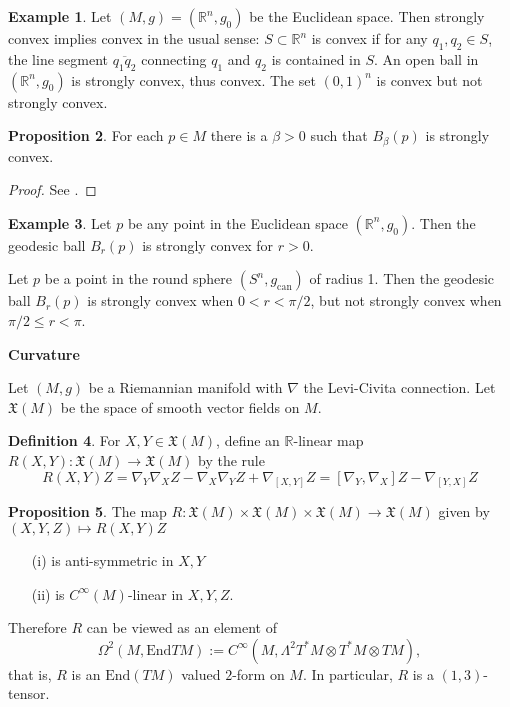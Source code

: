 \documentclass{amsart}
\numberwithin{equation}{section}
\newcommand{\bR}{\mathbb{R}}
\newcommand{\End}{\mathrm{End}}
\theoremstyle{definition}
\newtheorem{definition}{Definition} [section]
\newtheorem{example}[definition]{Example}
\theoremstyle{theorem}
\newtheorem{proposition}[definition]{Proposition}
\begin{document}
\begin{example}
Let $(M,g) = (\bR^n, g_0)$ be the Euclidean space.  Then strongly convex implies convex in the usual sense: $S\subset \bR^n$ is convex if for any $q_1, q_2\in S$, the
line segment $\overline{q_1q_2}$ connecting $q_1$ and $q_2$ is contained in $S$.
An open ball in $(\bR^n,g_0)$ is strongly convex, thus convex. 
The set $(0,1)^n$ is convex but not strongly convex.
\end{example}

\begin{proposition}
For each $p \in M$ there is a $\beta > 0$ such that $B_{\beta}(p)$ is strongly convex. 
\end{proposition}
\begin{proof}
See \cite[Chapter 3, Section 4]{dC}. 
\end{proof}

\begin{example}
Let $p$ be any point in the Euclidean space $(\bR^n,g_0)$. Then the geodesic ball $B_r(p)$ is strongly convex for $r>0$.

Let $p$ be a point in the round sphere $(S^n,g_{\mathrm{can}})$ of radius 1. Then the geodesic ball
$B_r(p)$ is strongly convex when $0<r<\pi/2$, but not strongly convex when $\pi/2\leq r< \pi$. 
\end{example}



\noindent
{\bf \large Curvature}

Let $(M,g)$ be a Riemannian manifold with $\nabla$ the Levi-Civita connection. Let $\mathfrak{X}(M)$ be the space of smooth vector fields on $M$. 

\begin{definition}
For $X,Y \in \mathfrak{X}(M)$, define an $\mathbb{R}$-linear map $R(X,Y) : \mathfrak{X}(M) \to \mathfrak{X}(M)$ by the rule 
\[
R(X,Y)Z = \nabla_Y \nabla_X Z - \nabla_X \nabla_Y Z + \nabla_{[X,Y]}Z = [\nabla_Y, \nabla_X]Z - \nabla_{[Y,X]}Z
\]
\end{definition}

\begin{proposition}
The map $R : \mathfrak{X}(M) \times \mathfrak{X}(M) \times  \mathfrak{X}(M) \to \mathfrak{X}(M)$ given by $(X,Y,Z) \mapsto R(X,Y)Z$ 
\begin{enumerate}
\item[(i)] is anti-symmetric in $X,Y$
\item[(ii)] is $C^\infty(M)$-linear in $X,Y,Z$. 
\end{enumerate}
Therefore $R$ can be viewed as an element of 
$$
\Omega^2(M, \End TM) := C^\infty(M, \Lambda^2 T^*M \otimes T^*M \otimes TM),
$$
that is, $R$ is an $\End(TM)$ valued $2$-form on $M$. In particular, $R$ is a $(1,3)$-tensor. 
\end{proposition}
\end{document}
